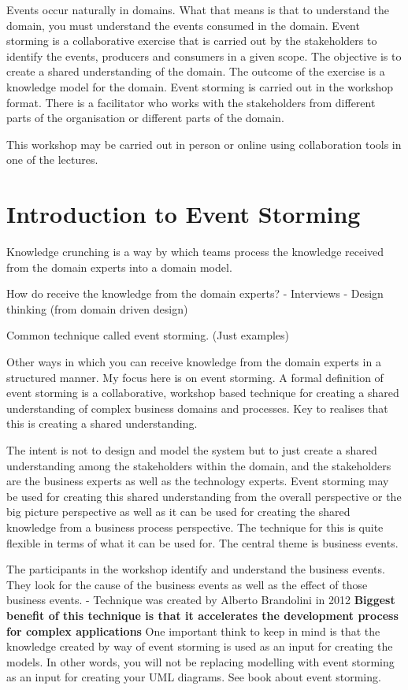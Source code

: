 Events occur naturally in domains.
What that means is that to understand the domain, you must understand the events consumed in the domain.
Event storming is a collaborative exercise that is carried out by the stakeholders to identify the events, producers and consumers in a given scope.
The objective is to create a shared understanding of the domain.
The outcome of the exercise is a knowledge model for the domain.
Event storming is carried out in the workshop format.
There is a facilitator who works with the stakeholders from different parts of the organisation or different parts of the domain.

This workshop may be carried out in person or online using collaboration tools in one of the lectures.


\section{Introduction to Event Storming}

Knowledge crunching is a way by which teams process the knowledge received from the domain experts into a domain model.

How do receive the knowledge from the domain experts?
- Interviews
- Design thinking (from domain driven design)

Common technique called event storming. (Just examples)

Other ways in which you can receive knowledge from the domain experts in a structured manner.
My focus here is on event storming.
A formal definition of event storming is a collaborative, workshop based technique for creating a shared understanding of complex business domains and processes.
Key to realises that this is creating a shared understanding.

The intent is not to design and model the system but to just create a shared understanding among the stakeholders within the domain, and the stakeholders are the business experts as well as the technology experts.
Event storming may be used for creating this shared understanding from the overall perspective or the big picture perspective as well as it can be used for creating the shared knowledge from a business process perspective.
The technique for this is quite flexible in terms of what it can be used for.
The central theme is business events.

The participants in the workshop identify and understand the business events.
They look for the cause of the business events as well as the effect of those business events.
- Technique was created by Alberto Brandolini in 2012 %
\textbf{Biggest benefit of this technique is that it accelerates the development process for complex applications}
One important think to keep in mind is that the knowledge created by way of event storming is used as an input for creating the models.
In other words, you will not be replacing modelling with event storming as an input for creating your UML diagrams. See book about event storming.


